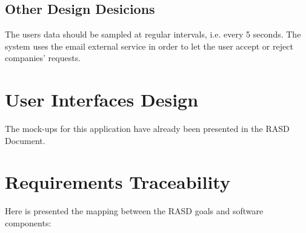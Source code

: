 \documentclass{article}
\begin{document}
\subsection{Other Design Desicions}
The users data should be sampled at regular intervals, i.e. every 5 seconds. \newline
The system uses the email external service in order to let the user accept or reject companies' requests.
\newpage
\section{User Interfaces Design}
The mock-ups for this application have already been presented in the RASD Document.
\section{Requirements Traceability}
Here is presented the mapping between the RASD goals and software components:
\end{document}
